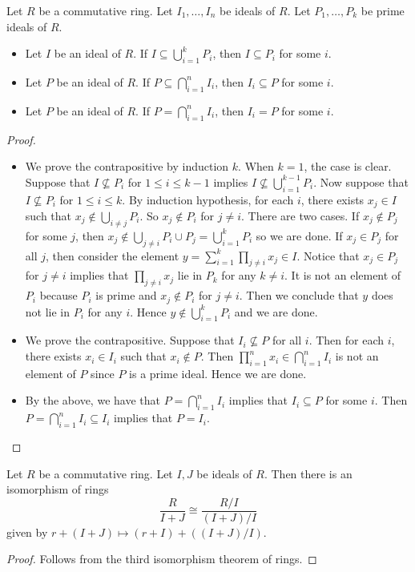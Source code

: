 \documentclass[a4paper]{article}
\begin{document}
\begin{prp}{}{} Let $R$ be a commutative ring. Let $I_1,\dots,I_n$ be ideals of $R$. Let $P_1,\dots,P_k$ be prime ideals of $R$. 
\begin{itemize}
\item Let $I$ be an ideal of $R$. If $I\subseteq\bigcup_{i=1}^kP_i$, then $I\subseteq P_i$ for some $i$. 
\item Let $P$ be an ideal of $R$. If $P\subseteq\bigcap_{i=1}^nI_i$, then $I_i\subseteq P$ for some $i$. 
\item Let $P$ be an ideal of $R$. If $P=\bigcap_{i=1}^nI_i$, then $I_i=P$ for some $i$. 
\end{itemize} \tcbline
\begin{proof}~\\
\begin{itemize}
\item We prove the contrapositive by induction $k$. When $k=1$, the case is clear. Suppose that $I\not\subseteq P_i$ for $1\leq i\leq k-1$ implies $I\not\subseteq\bigcup_{i=1}^{k-1}P_i$. Now suppose that $I\not\subseteq P_i$ for $1\leq i\leq k$. By induction hypothesis, for each $i$, there exists $x_j\in I$ such that $x_j\notin\bigcup_{i\neq j}P_i$. So $x_j\notin P_i$ for $j\neq i$. There are two cases. If $x_j\notin P_j$ for some $j$, then $x_j\notin\bigcup_{j\neq i}P_i\cup P_j=\bigcup_{i=1}^kP_i$ so we are done. If $x_j\in P_j$ for all $j$, then consider the element $y=\sum_{i=1}^k\prod_{j\neq i}x_j\in I$. Notice that $x_j\in P_j$ for $j\neq i$ implies that $\prod_{j\neq i}x_j$ lie in $P_k$ for any $k\neq i$. It is not an element of $P_i$ because $P_i$ is prime and $x_j\notin P_i$ for $j\neq i$. Then we conclude that $y$ does not lie in $P_i$ for any $i$. Hence $y\notin\bigcup_{i=1}^kP_i$ and we are done. 
\item We prove the contrapositive. Suppose that $I_i\not\subseteq P$ for all $i$. Then for each $i$, there exists $x_i\in I_i$ such that $x_i\notin P$. Then $\prod_{i=1}^nx_i\in\bigcap_{i=1}^nI_i$ is not an element of $P$ since $P$ is a prime ideal. Hence we are done. 
\item By the above, we have that $P=\bigcap_{i=1}^nI_i$ implies that $I_i\subseteq P$ for some $i$. Then $P=\bigcap_{i=1}^nI_i\subseteq I_i$ implies that $P=I_i$. 
\end{itemize}
\end{proof}
\end{prp}

\begin{prp}{}{} Let $R$ be a commutative ring. Let $I,J$ be ideals of $R$. Then there is an isomorphism of rings $$\frac{R}{I+J}\cong\frac{R/I}{(I+J)/I}$$ given by $r+(I+J)\mapsto(r+I)+((I+J)/I)$. \tcbline
\begin{proof}
Follows from the third isomorphism theorem of rings. 
\end{proof}
\end{prp}
\end{document}
